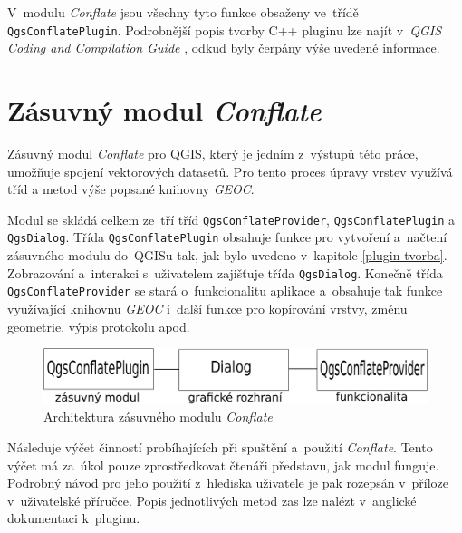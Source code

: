 V~modulu \textit{Conflate} jsou všechny tyto funkce obsaženy ve~třídě
\texttt{Qgs\-Con\-flate\-Plugin}. 
Podrobnější popis tvorby C++ pluginu lze najít v~\textit{QGIS Coding and 
Compilation Guide} %
, odkud byly čerpány výše uvedené informace.




\section{Zásuvný modul \textit{Conflate}}
\label{plugin-navrh}

Zásuvný modul \textit{Conflate} pro QGIS, který je jedním z~výstupů této práce,
umožňuje spojení vektorových datasetů. Pro tento proces úpravy vrstev využívá
tříd a metod výše popsané knihovny \textit{GEOC}.

Modul se skládá celkem ze~tří tříd \texttt{QgsConflateProvider}, 
\texttt{QgsConflatePlugin} a~ \texttt{QgsDialog}. Třída \texttt{QgsConflatePlugin} 
obsahuje funkce pro vytvoření a~načtení zásuvného modulu do~QGISu tak, jak bylo 
uvedeno v~kapitole \ref{plugin-tvorba}. Zobrazování a~interakci s~uživatelem 
zajišťuje třída \texttt{QgsDialog}. Konečně třída \texttt{QgsConflateProvider} 
se stará o~funkcionalitu aplikace a~obsahuje tak funkce využívající knihovnu 
\textit{GEOC} i~další funkce pro kopírování vrstvy, změnu geometrie, výpis 
protokolu apod.

\vspace{0.5cm}
\label{schema}
  \begin{figure}[hbt]
    \centering
      \includegraphics[width=350pt]{./pictures/schema.pdf}
      \caption{Architektura zásuvného modulu \textit{Conflate}}
      \label{fig:schema}
  \end{figure} 


Následuje výčet činností probíhajících při spuštění a~použití \textit{Conflate}.
Tento výčet má za~úkol pouze zprostředkovat čtenáři představu, jak modul funguje.
Podrobný návod pro jeho použití z~hlediska uživatele je pak rozepsán v~příloze
v~uživatelské příručce. Popis jednotlivých metod zas lze nalézt v~anglické
dokumentaci k~pluginu. %

